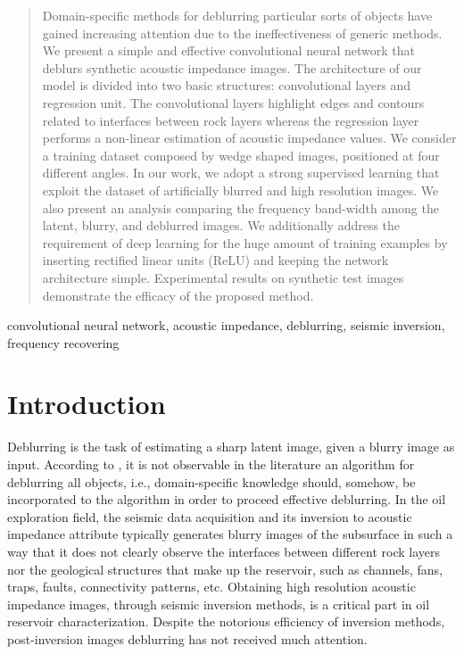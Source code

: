 \documentclass[conference]{IEEEtran}
\begin{document}
\begin{abstract}
Domain-specific methods for deblurring particular sorts of
objects have gained increasing attention due to the ineffectiveness
of generic methods.
We present a simple and effective convolutional
neural network that deblurs synthetic acoustic impedance images. 
The architecture of our model is divided into two basic structures: convolutional layers and regression unit. The convolutional layers highlight edges and contours related to
interfaces between rock layers whereas the regression layer
performs a non-linear estimation of acoustic impedance values.
We consider a training dataset composed by wedge shaped images, positioned at
four different angles. In our work, we adopt a strong supervised learning
that exploit the dataset of artificially blurred and high resolution images.
We also present an analysis comparing the frequency band-width among 
the latent, blurry, and deblurred images.
We additionally address the requirement of deep learning for the huge amount
of training examples by inserting rectified linear units (ReLU) and keeping
the network architecture simple. 
Experimental results on synthetic test images demonstrate the efficacy of the proposed method.
\end{abstract}

\begin{IEEEkeywords}
convolutional neural network, acoustic impedance, deblurring, seismic inversion, frequency recovering
\end{IEEEkeywords}

\section{Introduction}
Deblurring is the task of estimating a sharp latent image,
given a blurry image as input.
According to \cite{Grigorios2017}, it is not observable in the literature an algorithm for deblurring all objects, i.e., domain-specific knowledge should,
somehow, be incorporated to the algorithm in order to proceed effective deblurring.
In the oil exploration field, the seismic data acquisition and its
inversion to acoustic impedance attribute typically generates
blurry images of the subsurface in such a way that it does not
clearly observe the interfaces between different rock layers nor
the geological structures that make up the reservoir, such as channels, fans, traps, faults,
connectivity patterns, etc.
Obtaining high resolution acoustic impedance images, through seismic inversion methods,
is a critical part in oil reservoir characterization.
Despite the notorious efficiency of inversion methods,
post-inversion images deblurring has not received much attention.
\end{document}
